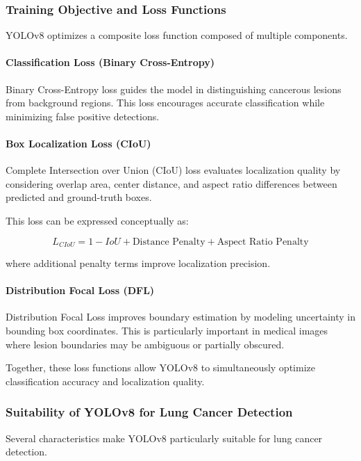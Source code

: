 \subsubsection{Training Objective and Loss Functions}

YOLOv8 optimizes a composite loss function composed of multiple components.

\paragraph{Classification Loss (Binary Cross-Entropy)}

Binary Cross-Entropy loss guides the model in distinguishing cancerous lesions from background regions. This loss encourages accurate classification while minimizing false positive detections.

\paragraph{Box Localization Loss (CIoU)}

Complete Intersection over Union (CIoU) loss evaluates localization quality by considering overlap area, center distance, and aspect ratio differences between predicted and ground-truth boxes.

This loss can be expressed conceptually as:

\[
L_{CIoU}
=
1 - IoU
+
\text{Distance Penalty}
+
\text{Aspect Ratio Penalty}
\]

where additional penalty terms improve localization precision.

\paragraph{Distribution Focal Loss (DFL)}

Distribution Focal Loss improves boundary estimation by modeling uncertainty in bounding box coordinates. This is particularly important in medical images where lesion boundaries may be ambiguous or partially obscured.

Together, these loss functions allow YOLOv8 to simultaneously optimize classification accuracy and localization quality.

\subsubsection{Suitability of YOLOv8 for Lung Cancer Detection}

Several characteristics make YOLOv8 particularly suitable for lung cancer detection.

